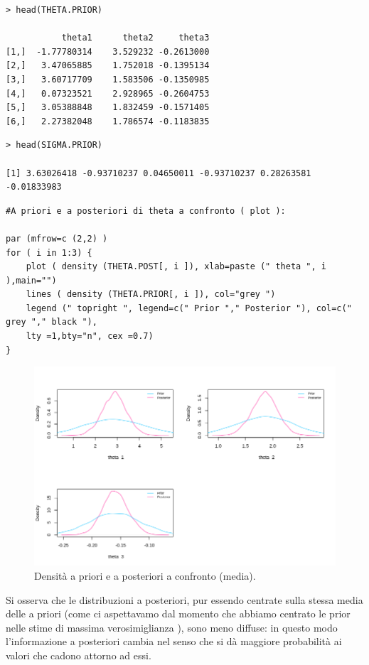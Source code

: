 \newpage
{
\color{red}
\begin{Verbatim}
> head(THETA.PRIOR)

           theta1      theta2     theta3
[1,]  -1.77780314    3.529232 -0.2613000
[2,]   3.47065885    1.752018 -0.1395134
[3,]   3.60717709    1.583506 -0.1350985
[4,]   0.07323521    2.928965 -0.2604753
[5,]   3.05388848    1.832459 -0.1571405
[6,]   2.27382048    1.786574 -0.1183835
\end{Verbatim}
}

{
\color{red}
\begin{Verbatim}
> head(SIGMA.PRIOR)

[1] 3.63026418 -0.93710237 0.04650011 -0.93710237 0.28263581 -0.01833983
\end{Verbatim}
}

\begin{lstlisting}[style=R]
#A priori e a posteriori di theta a confronto ( plot ):

par (mfrow=c (2,2) )
for ( i in 1:3) {
    plot ( density (THETA.POST[, i ]), xlab=paste (" theta ", i ),main="")
    lines ( density (THETA.PRIOR[, i ]), col="grey ")
    legend (" topright ", legend=c(" Prior "," Posterior "), col=c(" grey "," black "),
    lty =1,bty="n", cex =0.7)
}
\end{lstlisting}

\begin{figure}
    \centering
    \includegraphics[totalheight=8.5cm]{img/esercizio11-2-3.png}
    \caption{  Densità a priori e a posteriori a confronto (media).}
\end{figure}

Si osserva che le distribuzioni a posteriori, pur essendo centrate sulla stessa 
media delle a priori (come ci aspettavamo dal momento che abbiamo centrato le 
prior nelle stime di massima verosimiglianza ), sono meno diffuse: 
in questo modo l'informazione a posteriori cambia nel senso che si dà maggiore 
probabilità ai valori che cadono attorno ad essi.


